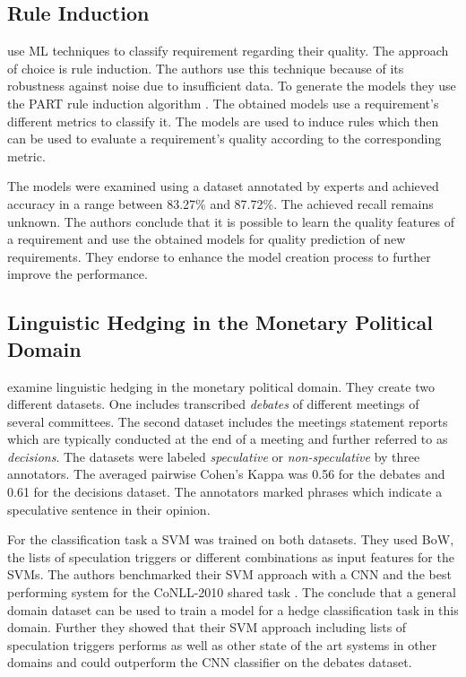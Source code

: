 \subsection{Rule Induction}
\textcite{Parra:2015} use \ac{ML} techniques to classify requirement regarding their quality.
The approach of choice is rule induction.
The authors use this technique because of its robustness against noise due to insufficient data.
To generate the models they use the PART rule induction algorithm \parencite{Eibe:1998}.
The obtained models use a requirement's different metrics to classify it.
The models are used to induce rules which then can be used to evaluate a requirement's quality according to the corresponding metric.

The models were examined using a dataset annotated by experts and achieved accuracy in a range between 83.27\% and 87.72\%.
The achieved recall remains unknown.
The authors conclude that it is possible to learn the quality features of a requirement and use the obtained models for quality prediction of new requirements.
They endorse to enhance the model creation process to further improve the performance.

\subsection{Linguistic Hedging in the Monetary Political Domain}
\textcite{Stajner:2017} examine linguistic hedging in the monetary political domain.
They create two different datasets.
One includes transcribed \textit{debates} of different meetings of several committees.
The second dataset includes the meetings statement reports which are typically conducted at the end of a meeting and further referred to as \textit{decisions}.
The datasets were labeled \textit{speculative} or \textit{non-speculative} by three annotators.
The averaged pairwise Cohen's Kappa \parencite{Cohen:1960} was 0.56 for the debates and 0.61 for the decisions dataset.
The annotators marked phrases which indicate a speculative sentence in their opinion.

For the classification task a \ac{SVM} was trained on both datasets.
They used \ac{BoW}, the lists of speculation triggers or different combinations as input features for the \acp{SVM}.
The authors benchmarked their \ac{SVM} approach with a \ac{CNN} and the best performing system for the CoNLL-2010 shared task \parencite{Farkas:2010}.
The conclude that a general domain dataset can be used to train a model for a hedge classification task in this domain.
Further they showed that their \ac{SVM} approach including lists of speculation triggers performs as well as other state of the art systems in other domains and could outperform the \ac{CNN} classifier on the debates dataset.

